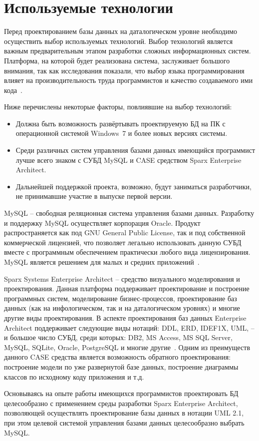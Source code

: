 \section{Используемые технологии} 
\label{sec:practice:menas_choice}

Перед проектированием базы данных на даталогическом уровне необходимо осуществить выбор используемых технологий. Выбор технологий является важным предварительным этапом разработки сложных информационных систем.
Платформа, на которой будет реализована система, заслуживает большого внимания, так как исследования показали, что выбор языка программирования влияет на производительность труда программистов и качество создаваемого ими кода~\cite[c.~59]{mcconnell_2005}.

Ниже перечислены некоторые факторы, повлиявшие на выбор технологий:
\begin{itemize}
	\item Должна быть возможность развёртывать проектируемую БД на ПК с операционной системой Windows~7 и более новых версиях системы.
	\item Среди различных систем управления базами данных имеющийся программист лучше всего знаком с СУБД MySQL и CASE средством Sparx Enterprise Architect.
	\item Дальнейшей поддержкой проекта, возможно, будут заниматься разработчики, не принимавшие участие в 	выпуске первой версии.
\end{itemize}

MySQL -- свободная реляционная система управления базами данных. Разработку и поддержку MySQL осуществляет корпорация Oracle. Продукт распространяется как под GNU General Public License, так и под собственной коммерческой лицензией, что позволяет легально использовать данную СУБД вместе с программным обеспечением практически любого вида лицензирования. MySQL является решением для малых и средних приложений~\cite{wiki_mysql}. 

Sparx Systems Enterprise Architect -- средство визуального моделирования и проектирования. Данная платформа поддерживает проектирование и построение программных систем, моделирование бизнес-процессов, проектирование баз данных (как на инфологическом, так и на даталогическом уровнях) и многие другие виды проектирования. В аспекте проектирования баз данных Enterprise Architect поддерживает следующие виды нотаций: DDL, ERD, IDEF1X, UML, -- и большое число СУБД, среди которых: DB2, MS Access, MS SQL Server, MySQL, SQLite, Oracle, PostgreSQL и многие другие~\cite{wiki_sparx_ea}. Одним из преимуществ данного CASE средства является возможность обратного проектирования: построение модели по уже развернутой базе данных, построение диаграммы классов по исходному коду приложения и т.д.

Основываясь на опыте работы имеющихся программистов проектировать БД целесообразно с применением среды разработки Sparx Enterprise Architect, позволяющей осуществлять проектирование базы данных в нотации UML 2.1, при этом целевой системой управления базами данных целесообразно выбрать MySQL.
